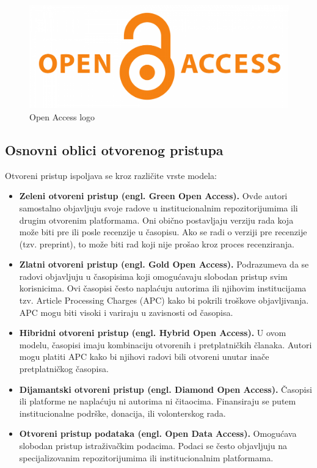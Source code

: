 \documentclass{article}
\begin{document}
\begin{figure}[htbp]
    \center
    \includegraphics[scale=0.15]{img/open-access-logo.png}
    \caption{Open Access logo}
\end{figure}

\subsection{Osnovni oblici otvorenog pristupa}

Otvoreni pristup ispoljava se kroz različite vrste modela:

\begin{itemize}
    \item \textbf{Zeleni otvoreni pristup (engl. Green Open Access).} Ovde autori samostalno objavljuju svoje radove u institucionalnim repozitorijumima ili drugim otvorenim platformama. Oni obično postavljaju verziju rada koja može biti pre ili posle recenzije u časopisu. Ako se radi o verziji pre recenzije (tzv. preprint), to može biti rad koji nije prošao kroz proces recenziranja.
    \item \textbf{Zlatni otvoreni pristup (engl. Gold Open Access).} Podrazumeva da se radovi objavljuju u časopisima koji omogućavaju slobodan pristup svim korisnicima. Ovi časopisi često naplaćuju autorima ili njihovim institucijama tzv. Article Processing Charges (APC) kako bi pokrili troškove objavljivanja. APC mogu biti visoki i variraju u zavisnosti od časopisa.
    \item \textbf{Hibridni otvoreni pristup (engl. Hybrid Open Access).} U ovom modelu, časopisi imaju kombinaciju otvorenih i pretplatničkih članaka. Autori mogu platiti APC kako bi njihovi radovi bili otvoreni unutar inače pretplatničkog časopisa.
    \item \textbf{Dijamantski otvoreni pristup (engl. Diamond Open Access).} Časopisi ili platforme ne naplaćuju ni autorima ni čitaocima. Finansiraju se putem institucionalne podrške, donacija, ili volonterskog rada.
    \item \textbf{Otvoreni pristup podataka (engl. Open Data Access).} Omogućava slobodan pristup istraživačkim podacima. Podaci se često objavljuju na specijalizovanim repozitorijumima ili institucionalnim platformama.
\end{itemize}
\end{document}
